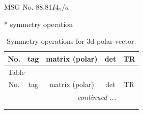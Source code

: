 \documentclass[fleqn,8pt]{jsarticle}
\begin{document}
\setcounter{MaxMatrixCols}{32}

\renewcommand{\tablename}{Table~}
\renewcommand{\figurename}{Figure~}
\begin{center}
\LARGE
MSG No. 88.81\quad$I4_{1}/a$
\end{center}
* symmetry operation
\renewcommand{\arraystretch}{1.3}
\begin{longtable}{ccccc}
\caption{Symmetry operations for 3d polar vector.}
 \\
 \hline \hline
No. & tag & matrix (polar) & det & TR \\ \hline \endfirsthead

\multicolumn{4}{l}{\tablename\ \thetable{}} \\
 \hline \hline
No. & tag & matrix (polar) & det & TR \\ \hline \endhead

 \hline \hline
\multicolumn{4}{r}{\footnotesize\it continued ...} \\ \endfoot

 \hline \hline
\multicolumn{4}{r}{} \\ \endlastfoot


\end{longtable}
\end{document}
